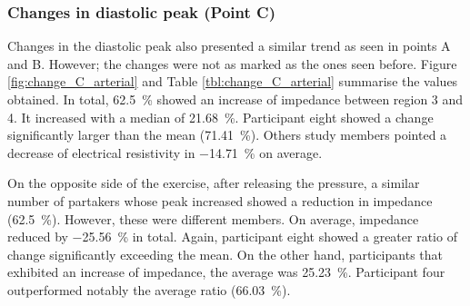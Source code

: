 \subsubsection{Changes in diastolic peak (Point C)}
\label{section apa 3.2.3}
Changes in the diastolic peak also presented a similar trend as seen in points A and B. However; the changes were not as marked as the ones seen before. Figure \ref{fig:change_C_arterial} and Table \ref{tbl:change_C_arterial} summarise the values obtained. In total, \SI{62.5}{\percent} showed an increase of impedance between region 3 and 4. It increased with a median of \SI{21.68}{\percent}. Participant eight showed a change significantly larger than the mean (\SI{71.41}{\percent}). Others study members pointed a decrease of electrical resistivity in \SI{-14.71}{\percent} on average.  

On the opposite side of the exercise, after releasing the pressure, a similar number of partakers whose peak increased showed a reduction in impedance (\SI{62.5}{\percent}).  However, these were different members. On average, impedance reduced by \SI{-25.56}{\percent} in total. Again, participant eight showed a greater ratio of change significantly exceeding the mean. On the other hand, participants that exhibited an increase of impedance, the average was \SI{25.23}{\percent}. Participant four outperformed notably the average ratio (\SI{66.03}{\percent}).

